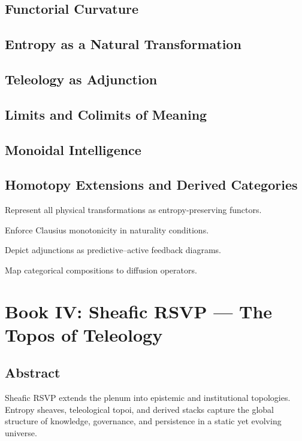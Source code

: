 \documentclass[12pt,oneside]{book}
\begin{document}
\chapter{Functorial Curvature}
\chapter{Entropy as a Natural Transformation}
\chapter{Teleology as Adjunction}
\chapter{Limits and Colimits of Meaning}
\chapter{Monoidal Intelligence}
\chapter{Homotopy Extensions and Derived Categories}

\begin{botinstructions}
  \item Represent all physical transformations as entropy-preserving functors.
  \item Enforce Clausius monotonicity in naturality conditions.
  \item Depict adjunctions as predictive–active feedback diagrams.
  \item Map categorical compositions to diffusion operators.
\end{botinstructions}

\part{Book IV: Sheafic RSVP — The Topos of Teleology}

\chapter*{Abstract}
Sheafic RSVP extends the plenum into epistemic and institutional topologies.
Entropy sheaves, teleological topoi, and derived stacks capture the global structure
of knowledge, governance, and persistence in a static yet evolving universe.
\end{document}
